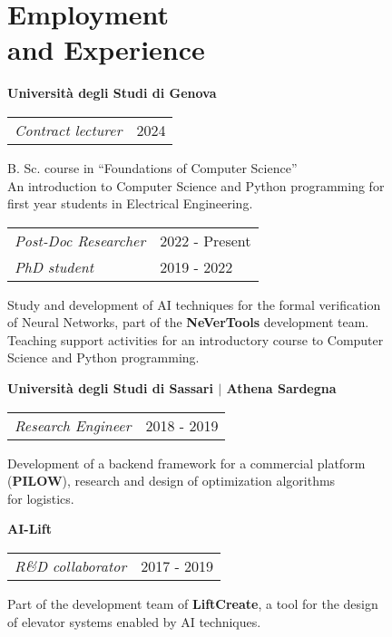 \section{\sc Employment \\and Experience}

{\bf{Universit\`a degli Studi di Genova}}\\
\begin{tabular}{@{}p{4in}p{2in}}
	\textit{Contract lecturer} & 2024\\
\end{tabular}

\begin{list1}
	\item[] B. Sc. course in ``Foundations of Computer Science''\\
	An introduction to Computer Science and Python programming for\\
	first year students in Electrical Engineering.\\
\end{list1}

\begin{tabular}{@{}p{4in}p{2in}}
	\textit{Post-Doc Researcher} & 2022 - Present\\
	\textit{PhD student} & 2019 - 2022\\
\end{tabular}

\begin{list1}
	\item[] Study and development of AI techniques for the formal verification\\
	of Neural Networks, part of the \textbf{NeVerTools} development team.\\
	Teaching support activities for an introductory course to Computer\\
	Science and Python programming.
\end{list1}


{\bf{Universit\`a degli Studi di Sassari $\vert$ Athena Sardegna}}\\
\begin{tabular}{@{}p{4in}p{2in}}
	\textit{Research Engineer} & 2018 - 2019\\
\end{tabular}

\begin{list1}
	\item[] Development of a backend framework for a commercial platform\\
	(\textbf{PILOW}), research and design of optimization algorithms\\
	for logistics.
\end{list1}


{\bf{AI-Lift}}\\
\begin{tabular}{@{}p{4in}p{2in}}
	\textit{R\&D collaborator}  & 2017 - 2019\\
\end{tabular}

\begin{list1}
	\item[] Part of the development team of \textbf{LiftCreate}, a tool for the design\\
	of elevator systems enabled by AI techniques.
\end{list1}
